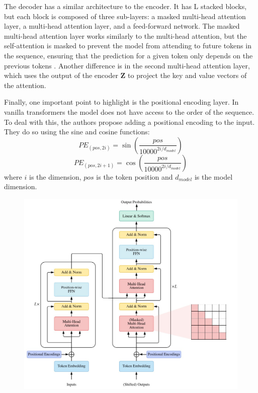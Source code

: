 The decoder has a similar architecture to the encoder. It has L stacked blocks, but each block is composed of three sub-layers: a masked multi-head attention layer, a multi-head attention layer, and a feed-forward network. The masked multi-head attention layer works similarly to the multi-head attention, but the self-attention is masked to prevent the model from attending to future tokens in the sequence, ensuring that the prediction for a given token only depends on the previous tokens \cite{lin2021surveytransformers}. Another difference is in the second multi-head attention layer, which uses the output of the encoder $\boldsymbol{Z}$ to project the key and value vectors of the attention.

Finally, one important point to highlight is the positional encoding layer. In vanilla transformers the model does not have access to the order of the sequence. To deal with this, the authors propose adding a positional encoding to the input. They do so using the sine and cosine functions:
\begin{equation}
    PE_{(pos,2i)} = \sin\left(\frac{pos}{10000^{2i/d_{model}}}\right)
\end{equation}
\begin{equation}
    PE_{(pos,2i+1)} = \cos\left(\frac{pos}{10000^{2i/d_{model}}}\right)
\end{equation}
where $i$ is the dimension, $pos$ is the token position and $d_{model}$ is the model dimension.

\begin{figure}[H]
    \centering
    \includegraphics[width=12cm]{Cap2_LitReview/model_basics/Transformers/transformer_arch.png}
    \caption{\cite{lin2021surveytransformers}}
    \label{fig:Transformer-arch}
\end{figure}

